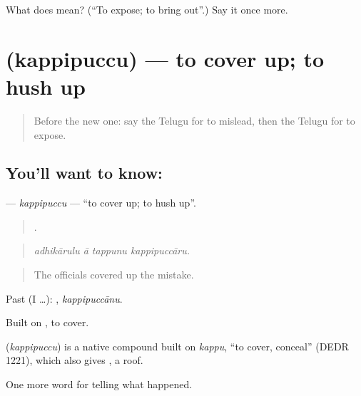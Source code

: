 \begin{tcolorbox}[breakable,colback=teal!4,colframe=teal!35!black,title={Before you move on}]
What does  mean? (\textquotedblleft{}To expose; to bring out\textquotedblright{}.) Say it once more.
\end{tcolorbox}
\section[\texorpdfstring{\te{కప్పిపుచ్చు} (kappipuccu)}{కప్పిపుచ్చు (kappipuccu)}]{ (kappipuccu) — to cover up; to hush up}

\label{lesson:TE-C354-kappipuccu}



\begin{quote}
Before the new one: say the Telugu for to mislead, then the Telugu for to expose.
\end{quote}

\subsection*{You'll want to know: }
\textbf{} — \emph{kappipuccu} — \textquotedblleft{}to cover up; to hush up\textquotedblright{}.

\begin{quote}
   .
\end{quote}

\begin{quote}
\emph{adhikārulu ā tappunu kappipuccāru.}
\end{quote}

\begin{quote}
The officials covered up the mistake.
\end{quote}

Past (I …): , \emph{kappipuccānu}.

Built on , to cover.

\begin{cousinweb}
\textbf{} (\emph{kappipuccu}) is a native compound built on \emph{kappu}, \textquotedblleft{}to cover, conceal\textquotedblright{} (DEDR 1221), which also gives , a roof.
\end{cousinweb}

\begin{grammarlens}[title={What you've built}]
One more word for telling what happened.
\end{grammarlens}

